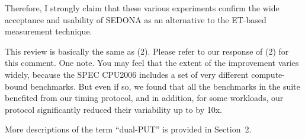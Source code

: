 \documentclass[10pt,letterpaper]{article}
\newenvironment{myindentpar}[1]%
{\begin{list}{}
         {\vspace{10pt}
					\setlength{\leftmargin}{#1}}
          \item[]
}
{\end{list}}
\newcommand{\rev}[1]{\begin{myindentpar}{.25in} {\em {\color{blue}{#1}}}\end{myindentpar}}
\begin{document}
Therefore, I strongly claim that these various experiments confirm 
the wide acceptance and usability of SEDONA as an alternative to the ET-based measurement technique. 

\rev{ 
(3) The improvement of the SEDONA is little. And the extent of the each
benchmark’s improvement described in Table 3 varies widely. Thus, the
experimental results does not confirm whether the SEDONA is widely
practical or is useful.
}

This review is basically the same as (2). Please refer to our response of (2) for this comment. 
One note. You may feel that the extent of the improvement varies widely, 
because the SPEC CPU2006 includes a set of very different compute-bound benchmarks. 
But even if so, we found that all the benchmarks in the suite benefited from our timing protocol, and in addition, 
for some workloads, our protocol significantly reduced their variability up to by 10x.  


\rev{ 
(4) Since the explanation of ``dual-PUT'' is not enough, I can not well
understand the algorithm shown in Fig. 3. 
}

More descriptions of the term ``dual-PUT'' is provided in Section~2. 
\rev{
Similarly, what is “1st
Half’s ET (ms)” attached at Fig. 4(b), 4(c), 4(d) ? I understood only that
the label is related with “dual-PUT”. These words are important in the
manuscript. So, please keep in mind to write understandably.
}
\end{document}

